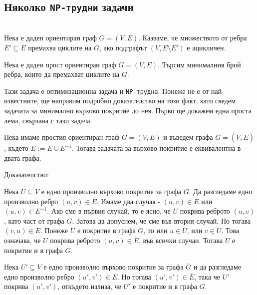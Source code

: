 \documentclass[12pt,twoside,a4paper]{article}
\begin{document}
	\subsection{Няколко \texttt{NP-трудни} задачи}
	
	\begin{definition}\label{def:edges-acyclic}~\\
		\indent Нека е даден ориентиран граф $G=(V,E)$. Казваме, че множеството от ребра $E' \subseteq E$ премахва циклите на $G$, ако подграфът $(V,E \setminus E')$ е ацикличен.
	\end{definition}
	
	\begin{problem} Нека е даден прост ориентиран граф $G=(V,E)$. Търсим минималния брой ребра, които да премахват циклите на $G$.
	\end{problem}
	
	Тази задача е оптимизационна задача и \texttt{NP-трудна}. Понеже не е от най-известните, ще направим подробно доказателство на този факт, като сведем задачата за минимално върхово покритие до нея. Първо ще докажем една проста лема, свързана с тази задача.
	
	\begin{lemma}\label{lemma:vertex-cover} Нека имаме простия ориентиран граф $G=(V,E)$ и въведем графа $\overline{G}=(V,\overline{E})$, където $\overline{E}:=E \cup E^{-1}$. Тогава задачата за върхово покритие е еквивалентна в двата графа.
		
		\noindent Доказателство:
		
		Нека $U \subseteq V$ е едно произволно върхово покритие за графа $G$. Да разгледаме едно произволно ребро $(u,v) \in \overline{E}$. Имаме два случая - $(u,v) \in E$ или $(u,v) \in E^{-1}$. Ако сме в първия случай, то е ясно, че $U$ покрива реброто $(u,v)$, като част от графа $G$. Затова да допуснем, че сме във втория случай. Но тогава $(v,u) \in E$. Понеже $U$ е покритие в графа $G$, то или $u \in U$, или $v \in U$. Това означава, че $U$ покрива реброто $(u,v) \in \overline{E}$, във всички случаи. Тогава $U$ е покритие и в графа $\overline{G}$.
		
		Нека $U' \subseteq V$ е едно произволно върхово покритие за графа $\overline{G}$ и да разгледаме едно произволно ребро $(u',v') \in E$. Но тогава $(u',v') \in \overline{E}$, така че $U'$ покрива $(u',v')$, откъдето излиза, че $U'$ е покритие и в графа $G$.
	\end{lemma}
	
\end{document}
